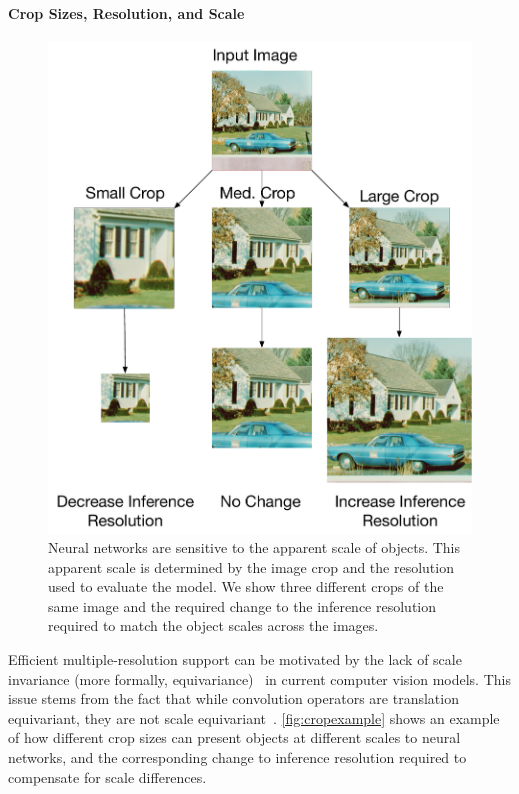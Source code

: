\paragraph{Crop Sizes, Resolution, and Scale}
\label{sec:invariance}
\begin{figure}
    \centering
    \includegraphics[width=\textwidth]{e2e_diagrams/scale variations.pdf}
\caption{Neural networks are sensitive to the apparent scale of objects. This apparent scale is determined by the image crop and the resolution used to evaluate the model. We show three different crops of the same image and the required change to the inference resolution required to match the object scales across the images.}
    \label{fig:cropexample}
\end{figure}
Efficient multiple-resolution support can be motivated by the lack of scale invariance (more formally, equivariance)~\cite{sosnovik2019scaleequivariant} in current computer vision models.
This issue stems from the fact that while convolution operators are translation equivariant, they are not scale equivariant~\cite{touvron2019fixing}.
\autoref{fig:cropexample} shows an example of how different crop sizes can present objects at different scales to neural networks, and the corresponding change to inference resolution required to compensate for scale differences.
